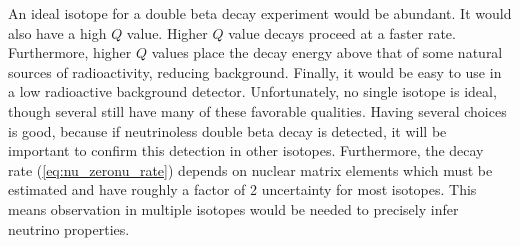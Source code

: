 \documentclass[herrin-thesis.tex]{subfiles}
\begin{document}
An ideal isotope for a double beta decay experiment would be abundant. It would also have a high \(Q\) value. Higher \(Q\) value decays proceed at a faster rate. Furthermore, higher \(Q\) values place the decay energy above that of some natural sources of radioactivity, reducing background. Finally, it would be easy to use in a low radioactive background detector. Unfortunately, no single isotope is ideal, though several still have many of these favorable qualities. Having several choices is good, because if neutrinoless double beta decay is detected, it will be important to confirm this detection in other isotopes. Furthermore, the decay rate (\cref{eq:nu_zeronu_rate}) depends on nuclear matrix elements which must be estimated and have roughly a factor of 2 uncertainty for most isotopes. This means observation in multiple isotopes would be needed to precisely infer neutrino properties.
\end{document}
